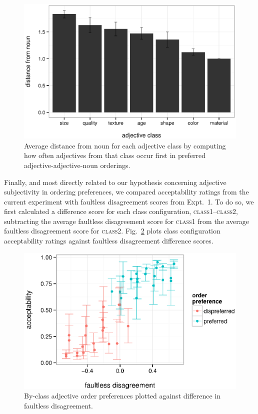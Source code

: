 \documentclass[11pt]{article}
\begin{document}
\begin{figure}[h!]
	\centering
	\includegraphics[width=.8\linewidth]{plots/class_distance_by_adj.eps}
	\caption{Average distance from noun for each adjective class by computing how often adjectives from that class occur first in preferred adjective-adjective-noun orderings.}\label{class-distance-by-adj}
\end{figure}

Finally, and most directly related to our hypothesis concerning adjective subjectivity in ordering preferences, we compared acceptability ratings from the current experiment with faultless disagreement scores from Expt.~1. To do so, we first calculated a difference score for each class configuration, \textsc{class1}--\textsc{class2}, subtracting the average faultless disagreement score for \textsc{class1} from the average faultless disagreement score for \textsc{class2}. Fig.~\ref{faultless-order} plots class configuration acceptability ratings against faultless disagreement difference scores.

\begin{figure}[h!]
	\centering
	\includegraphics[width=.8\linewidth]{plots/faultless_order_preference.eps}
	\caption{By-class adjective order preferences plotted against difference in faultless disagreement.}\label{faultless-order}
\end{figure}
\end{document}
